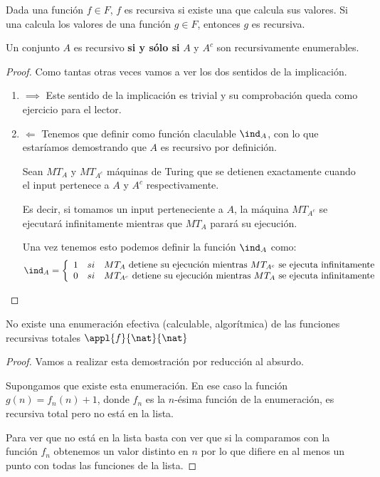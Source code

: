 \begin{theorem}
Dada una función $f\in F$, $f$ es recursiva si existe una \MT que calcula sus valores. Si una \MT calcula los valores de una función $g \in F$, entonces $g$ es recursiva.
\end{theorem}

\begin{theorem}
Un conjunto $A$ es recursivo \textbf{si y sólo si} $A$ y $A^c$ son recursivamente enumerables.
\end{theorem}
\begin{proof}
Como tantas otras veces vamos a ver los dos sentidos de la implicación.
\begin{enumerate}
\item $\implies$
Este sentido de la implicación es trivial y su comprobación queda como ejercicio para el lector.

\item $\Longleftarrow$
Tenemos que definir como función claculable $\ind_A$, con lo que estaríamos demostrando que $A$ es recursivo por definición.

Sean $MT_A$ y $MT_{A^c}$ máquinas de Turing que se detienen exactamente cuando el input pertenece a $A$ y $A^c$ respectivamente.

Es decir, si tomamos un input perteneciente a $A$, la máquina $MT_{A^c}$ se ejecutará infinitamente mientras que $MT_{A}$ parará su ejecución.

Una vez tenemos esto podemos definir la función $\ind_A$ como:
\[\ind_A = \left\{ \begin{array}{lll}
1 & si & MT_A \text{ detiene su ejecución mientras } MT_{A^c} \text{ se ejecuta infinitamente}\\
0 & si & MT_{A^c} \text{ detiene su ejecución mientras } MT_{A} \text{ se ejecuta infinitamente}
\end{array}\right.\]
\end{enumerate}
\end{proof}

\begin{theorem}
No existe una enumeración efectiva (calculable, algorítmica) de las funciones recursivas totales $\appl{f}{\nat}{\nat}$
\end{theorem}
\begin{proof}
Vamos a realizar esta demostración por reducción al absurdo.

Supongamos que existe esta enumeración. En ese caso la función $g(n)=f_n(n)+1$, donde $f_n$ es la $n$-ésima función de la enumeración, es recursiva total pero no está en la lista.

Para ver que no está en la lista basta con ver que si la comparamos con la función $f_n$ obtenemos un valor distinto en $n$ por lo que difiere en al menos un punto con todas las funciones de la lista.
\end{proof}

